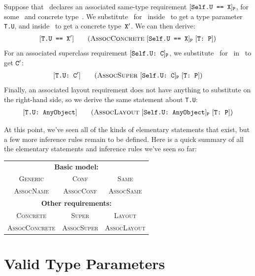 \documentclass[../generics]{subfiles}
\begin{document}
Suppose that \tP\ declares an associated same-type requirement $[\texttt{Self.U == X}]_{\texttt{P}}$, for some \SelfU\ and concrete type~\tX. We substitute \tT\ for \tSelf\ inside \SelfU\ to get a type parameter \texttt{T.U}, and inside \tX\ to get a concrete type~$\texttt{X}'$. We can then derive:
\begin{gather*}
\AssocConcreteStepDef
\end{gather*}
For an associated superclass requirement $[\texttt{Self.U:~C}]_{\texttt{P}}$, we substitute \tT\ for \tSelf\ in \tC\ to get $\texttt{C}'$:
\begin{gather*}
\AssocSuperStepDef
\end{gather*}
Finally, an associated layout requirement does not have anything to substitute on the right-hand side, so we derive the same statement about \texttt{T.U}:
\begin{gather*}
\AssocLayoutStepDef
\end{gather*}

\pagebreak

At this point, we've seen all of the kinds of elementary statements that exist, but a few more inference rules remain to be defined. Here is a quick summary of all the elementary statements and inference rules we've seen so far:
\begin{center}
\begin{tabular}{ccc}
\toprule
\multicolumn{3}{c}{\textbf{Basic model:}}\\
\textsc{Generic}&\textsc{Conf}&\textsc{Same}\\
\textsc{AssocName}&\textsc{AssocConf}&\textsc{AssocSame}\\
\midrule
\multicolumn{3}{c}{\textbf{Other requirements:}}\\
\textsc{Concrete}&\textsc{Super}&\textsc{Layout}\\
\textsc{AssocConcrete}&\textsc{AssocSuper}&\textsc{AssocLayout}\\
\bottomrule
\end{tabular}
\end{center}

\section{Valid Type Parameters}\label{valid type params}
\end{document}

